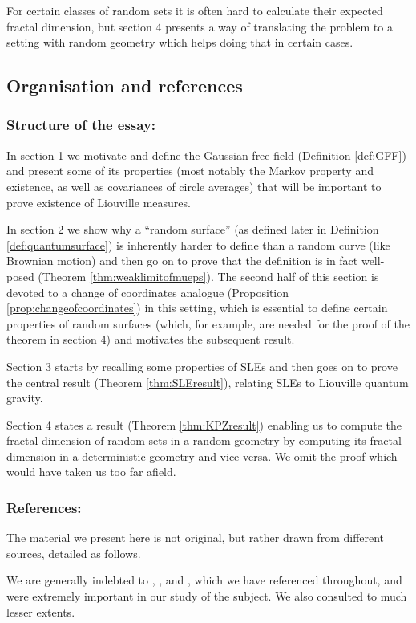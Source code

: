 \documentclass[11pt,reqno]{amsart}
\numberwithin{equation}{section}
\begin{document}
For certain classes of random sets it is often hard to calculate their expected fractal dimension, but section 4 presents a way of translating the problem to a setting with random geometry which  helps doing that in certain cases.

\subsection*{Organisation and references}
\subsubsection*{Structure of the essay:} In section 1 we motivate and define the Gaussian free field (Definition \ref{def:GFF}) and present some of its properties (most notably the Markov property and existence, as well as covariances of circle averages) that will be important to prove existence of Liouville measures.

In section 2 we show why a ``random surface'' (as defined later in Definition \ref{def:quantumsurface}) is inherently harder to define than a random curve (like Brownian motion) and then go on to prove that the definition is in fact well-posed (Theorem \ref{thm:weaklimitofmueps}).
The second half of this section is devoted to a change of coordinates analogue (Proposition \ref{prop:changeofcoordinates}) in this setting, which is essential to define certain properties of random surfaces (which, for example, are needed for the proof of the theorem in section 4) and motivates the subsequent result.

Section 3 starts by recalling some properties of SLEs and then goes on to prove the central result (Theorem \ref{thm:SLEresult}), relating SLEs to Liouville quantum gravity.

Section 4 states a result (Theorem \ref{thm:KPZresult}) enabling us to compute the fractal dimension of random sets in a random geometry by computing its fractal dimension in a deterministic geometry and vice versa. We omit the proof which would have taken us too far afield.


\subsubsection*{References:} The material we present here is not original, but rather drawn from  different sources, detailed as follows. 

We are generally indebted to \cite{She07}, \cite{Dup10}, and \cite{She15}, which we have referenced throughout, and were  extremely important in our study of the subject. We also consulted \cite{Dup14} to much lesser extents.
\end{document}
